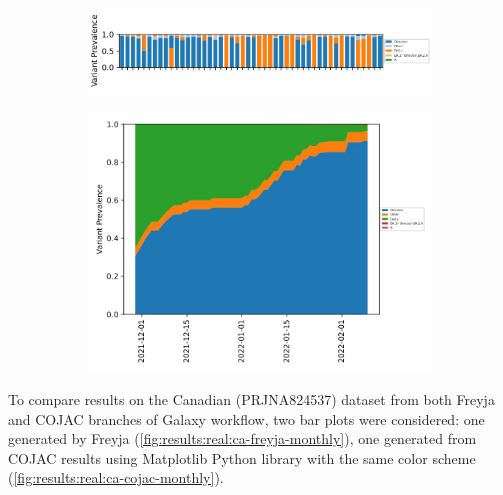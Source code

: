     \begin{figure}[H]
        \centering
        \begin{subfigure}[b]{1\textwidth}
        \includegraphics[width=1\textwidth]{figures/results/real/ca-freyja-samples.png}
        \label{fig:results:real:ca-freyja-samples}
        \end{subfigure}
        \hfill
        \begin{subfigure}[b]{0.8\textwidth}
        \includegraphics[width=1\textwidth]{figures/results/real/ca-freyja-daily.jpg}
        \label{fig:results:real:ca-freyja-daily}
        \end{subfigure}
        \hfill
    \end{figure}
    
    To compare results on the Canadian (PRJNA824537) dataset from both Freyja and COJAC branches of Galaxy workflow, two bar plots were considered: one generated by Freyja (\cref{fig:results:real:ca-freyja-monthly}), one generated from COJAC results using Matplotlib Python library with the same color scheme (\cref{fig:results:real:ca-cojac-monthly}). 
    
